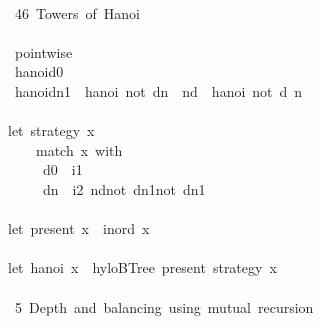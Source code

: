 \documentclass[a4paper]{article}
\begin{document}
\begin{tabbing}
\ttfamily ~~\\
\ttfamily ~~46~Towers~of~Hanoi~\\
\ttfamily ~\\
\ttfamily ~~pointwise\\
\ttfamily ~~hanoid0~~\\
\ttfamily ~~hanoidn1~~hanoi~not~dn~~nd~~hanoi~not~d~n\\
\ttfamily ~\\
\ttfamily ~let~strategy~x~\\
\ttfamily ~~~~~match~x~with\\
\ttfamily ~~~~~~d0~~i1~\\
\ttfamily ~~~~~~dn~~i2~ndnot~dn1not~dn1\\
\ttfamily ~\\
\ttfamily ~let~present~x~~inord~x\\
\ttfamily ~\\
\ttfamily ~let~hanoi~x~~hyloBTree~present~strategy~x\\
\ttfamily ~\\
\ttfamily ~~5~Depth~and~balancing~using~mutual~recursion~\\

\end{tabbing}
\end{document}
